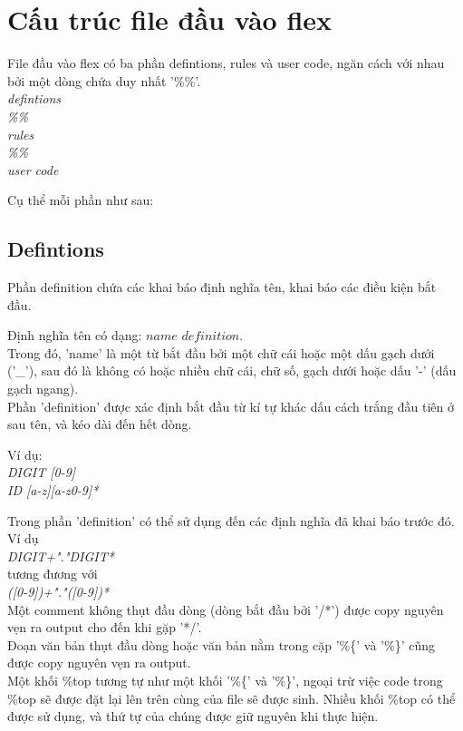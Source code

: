 \documentclass[14pt,a4paper]{extreport}
\begin{document}
\chapter{Cấu trúc file đầu vào flex}
File đầu vào flex có ba phần defintions, rules và user code, ngăn cách với nhau bởi một dòng chứa duy nhất '\%\%'.\\
\textit{defintions\\
\%\% \\
rules\\
\%\% \\
user code}

Cụ thể mỗi phần như sau:

\section{Defintions}
Phần definition chứa các khai báo định nghĩa tên, khai báo các điều kiện bắt đầu.

Định nghĩa tên có dạng: $ name $ $ definition $.\\
Trong đó, 'name' là một từ bắt đầu bởi một chữ cái hoặc một dấu gạch dưới ('\_'), sau đó là không có hoặc nhiều chữ cái, chữ số, gạch dưới hoặc dấu '-' (dấu gạch ngang). \\
Phần 'definition' được xác định bắt đầu từ kí tự khác dấu cách trắng đầu tiên ở sau tên, và kéo dài đến hết dòng. 

Ví dụ:\\
\textit{DIGIT     [0-9]  \\
ID       [a-z][a-z0-9]*\\}

Trong phần 'definition' có thể sử dụng đến các định nghĩa đã khai báo trước đó. Ví dụ\\
\hspace*{2cm} \textit{{DIGIT}+"."{DIGIT}*}\\
tương đương với \\
\hspace*{2cm} \textit{([0-9])+"."([0-9])*}\\

Một comment không thụt đầu dòng (dòng bắt đầu bởi '/*') được copy nguyên vẹn ra output cho đến khi gặp '*/'.\\
Đoạn văn bản thụt đầu dòng hoặc văn bản nằm trong cặp '\%\{' và '\%\}' cũng được copy nguyên vẹn ra output.\\
Một khối \%top tương tự như một khối '\%\{' và '\%\}', ngoại trừ việc code trong \%top sẽ được đặt lại lên trên cùng của file sẽ được sinh. Nhiều khối \%top có thể được sử dụng, và thứ tự của chúng được giữ nguyên khi thực hiện.
\end{document}
